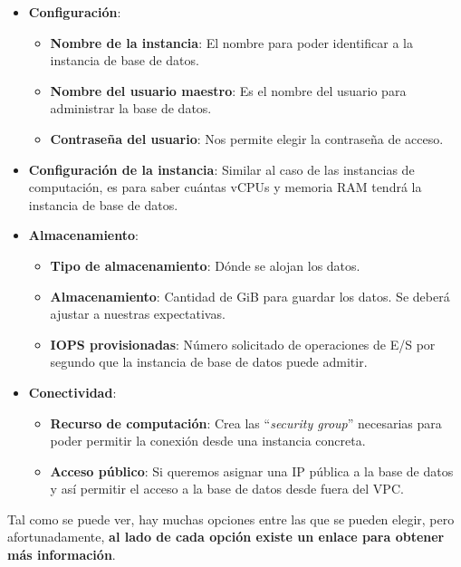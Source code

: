 \begin{itemize}
	\item \textbf{Configuración}: 
	\begin{itemize}
		\item \textbf{Nombre de la instancia}: El nombre para poder identificar a la instancia de base de datos.
		\item \textbf{Nombre del usuario maestro}: Es el nombre del usuario para administrar la base de datos.
		\item \textbf{Contraseña del usuario}: Nos permite elegir la contraseña de acceso.
	\end{itemize}
	
	\item \textbf{Configuración de la instancia}: Similar al caso de las instancias de computación, es para saber cuántas vCPUs y memoria RAM tendrá la instancia de base de datos.
	
	\item \textbf{Almacenamiento}: 
	\begin{itemize}
		\item \textbf{Tipo de almacenamiento}: Dónde se alojan los datos.
		\item \textbf{Almacenamiento}: Cantidad de GiB para guardar los datos. Se deberá ajustar a nuestras expectativas.
		
		\item \textbf{IOPS provisionadas}: Número solicitado de operaciones de E/S por segundo que la instancia de base de datos puede admitir.
	\end{itemize}
	
	\item \textbf{Conectividad}: 
	\begin{itemize}
		\item \textbf{Recurso de computación}: Crea las “\textit{security group}” necesarias para poder permitir la conexión desde una instancia concreta.
		\item \textbf{Acceso público}: Si queremos asignar una IP pública a la base de datos y así permitir el acceso a la base de datos desde fuera del VPC.
	\end{itemize}
\end{itemize}

Tal como se puede ver, hay muchas opciones entre las que se pueden elegir, pero afortunadamente, \textbf{al lado de cada opción existe un enlace para obtener más información}.


